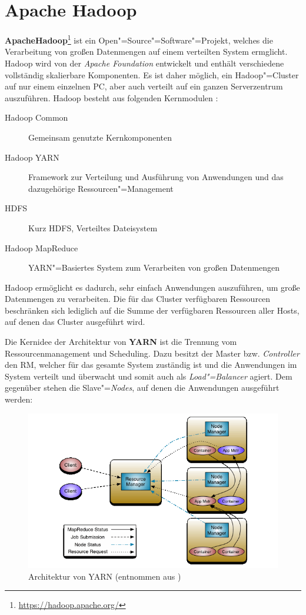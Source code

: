 \section{Apache Hadoop}
\label{sec:hadoop}

\textbf{Apache\texttrademark Hadoop\textregistered}\footnote{\url{https://hadoop.apache.org/}} ist ein Open"=Source"=Software"=Projekt, welches die Verarbeitung von großen Datenmengen auf einem verteilten System ermglicht.
Hadoop wird von der \emph{Apache Foundation} entwickelt und enthält verschiedene vollständig skalierbare Komponenten.
Es ist daher möglich, ein Hadoop"=Cluster auf nur einem einzelnen PC, aber auch verteilt auf ein ganzen Serverzentrum auszuführen.
Hadoop besteht aus folgenden Kernmodulen \cite{HadoopHomePage}:

\begin{description}
	\item[Hadoop Common] Gemeinsam genutzte Kernkomponenten
	\item[Hadoop YARN] Framework zur Verteilung und Ausführung von Anwendungen und das dazugehörige Ressourcen"=Management
	\item[\acl{HDFS}] Kurz \acs{HDFS}, Verteiltes Dateisystem
	\item[Hadoop MapReduce] YARN"=Basiertes System zum Verarbeiten von großen Datenmengen
\end{description}

Hadoop ermöglicht es dadurch, sehr einfach Anwendungen auszuführen, um große Datenmengen zu verarbeiten.
Die für das Cluster verfügbaren Ressourcen beschränken sich lediglich auf die Summe der verfügbaren Ressourcen aller Hosts, auf denen das Cluster ausgeführt wird.

Die Kernidee der Architektur von \textbf{YARN} ist die Trennung vom Ressourcenmanagement und Scheduling.
Dazu besitzt der Master bzw. \emph{Controller} den \ac{RM}, welcher für das gesamte System zuständig ist und die Anwendungen im System verteilt und überwacht und somit auch als \emph{Load"=Balancer} agiert.
Dem gegenüber stehen die Slave"=\emph{Nodes}, auf denen die Anwendungen ausgeführt werden:

\begin{figure}[h]
    \includegraphics{./images/yarn_architecture.png}
    \caption[Architektur von YARN]
    {Architektur von YARN (entnommen aus \cite{HadoopYarnArch271})}
    \label{fig:yarnarch}
\end{figure}

